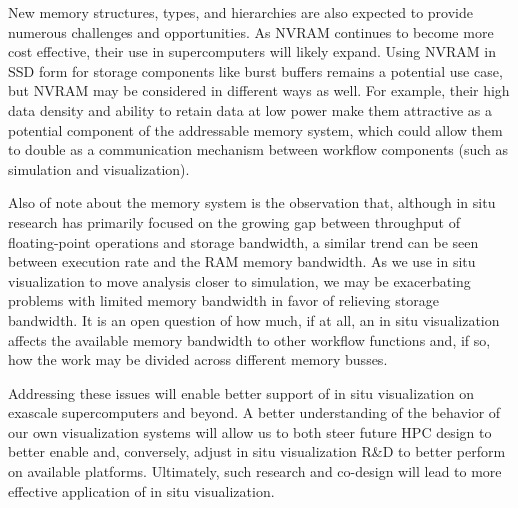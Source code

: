 \begin{refsection}
New memory structures, types, and hierarchies are also expected to provide numerous challenges and opportunities. As NVRAM continues to become more cost effective, their use in supercomputers will likely expand. Using NVRAM in SSD form for storage components like burst buffers remains a potential use case, but NVRAM may be considered in different ways as well. For example, their high data density and ability to retain data at low power make them attractive as a potential component of the addressable memory system, which could allow them to double as a communication mechanism between workflow components (such as simulation and visualization).

Also of note about the memory system is the observation that, although in situ research has primarily focused on the growing gap between throughput of floating-point operations and storage bandwidth, a similar trend can be seen between execution rate and the RAM memory bandwidth. As we use in situ visualization to move analysis closer to simulation, we may be exacerbating problems with limited memory bandwidth in favor of relieving storage bandwidth. It is an open question of how much, if at all, an in situ visualization affects the available memory bandwidth to other workflow functions and, if so, how the work may be divided across different memory busses.

Addressing these issues will enable better support of in situ visualization on exascale supercomputers and beyond. A better understanding of the behavior of our own visualization systems will allow us to both steer future HPC design to better enable and, conversely, adjust in situ visualization R\&D to better perform on available platforms. Ultimately, such research and co-design will lead to more effective application of in situ visualization.

\printbibliography
\end{refsection}


